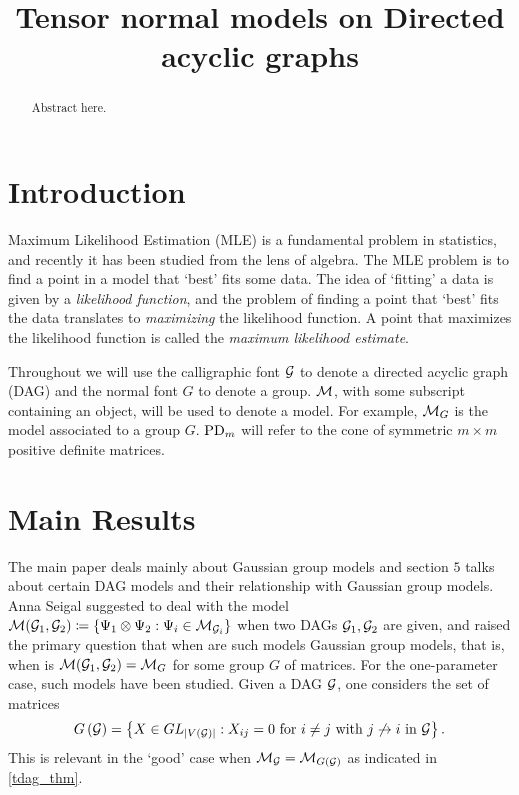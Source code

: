 
\renewcommand\intercal{{\cramped{{}^\mathsf{T}}}}
\setcounter{tocdepth}{3}
\usepackage{etoolbox}

\title{Tensor normal models on Directed acyclic graphs}

\date{}






\begin{abstract}
Abstract here.
\end{abstract}
\maketitle

\section{Introduction}


Maximum Likelihood Estimation (MLE) is a fundamental problem in statistics, and recently it has been studied from the lens of algebra. The MLE problem is to find a point in a model that `best' fits some data. The idea of `fitting' a data is given by a \emph{likelihood function}, and the problem of finding a point that `best' fits the data translates to \emph{maximizing} the likelihood function. A point that maximizes the likelihood function is called the \emph{maximum likelihood estimate}.

Throughout we will use the calligraphic font ${\mathcal{G}}$ to denote a directed acyclic graph (DAG) and the normal font $G$ to denote a group. ${\mathcal{M}}$, with some subscript containing an object, will be used to denote a model. For example, ${\mathcal{M}}_G$ is the model associated to a group $G$. $\operatorname{PD}_m$ will refer to the cone of symmetric $m\times m$ positive definite matrices.


\section{Main Results}


The main paper \cite{mainpaper} deals mainly about Gaussian group models and section $5$ talks about certain DAG models and their relationship with Gaussian group models. Anna Seigal suggested to deal with the model ${\mathcal{M}}({\mathcal{G}}_1,{\mathcal{G}}_2)\coloneqq \left\{\Psi_1\otimes \Psi_2: \Psi_i\in {\mathcal{M}}_{{\mathcal{G}}_i}\right\}$ when two DAGs ${\mathcal{G}}_1,{\mathcal{G}}_2$ are given, and raised the primary question that when are such models Gaussian group models, that is, when is ${\mathcal{M}}({\mathcal{G}}_1,{\mathcal{G}}_2) = {\mathcal{M}}_G$ for some group $G$ of matrices. For the one-parameter case, such models have been studied. Given a DAG ${\mathcal{G}}$, one considers the set of matrices $$G\left({\mathcal{G}}\right) =  \left\{X\in GL_{\left| V({\mathcal{G}}) \right|}: X_{ij} = 0 \text{ for } i\neq j \text{ with } j\not \to i \text{ in }{\mathcal{G}}\right\}.$$
This is relevant in the `good' case when ${\mathcal{M}}_{\mathcal{G}} = {\mathcal{M}}_{G\left({\mathcal{G}}\right)}$ as indicated in \cref{tdag_thm}. 

